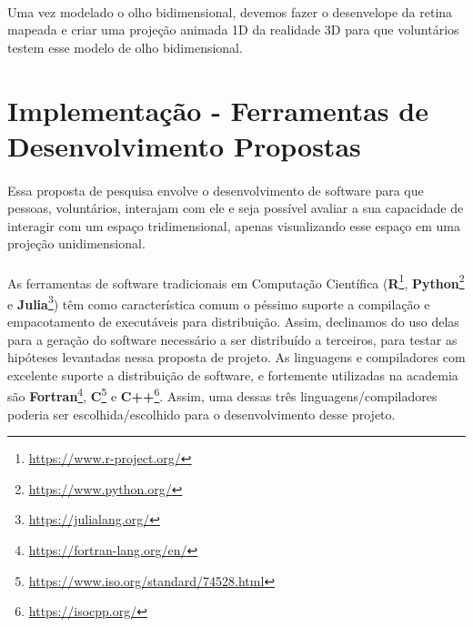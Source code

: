 \documentclass{article}
\begin{document}
	\paragraph{}
	Uma vez modelado o olho bidimensional, devemos fazer o desenvelope da retina mapeada e criar uma projeção animada 1D da realidade 3D para que voluntários testem esse modelo de olho bidimensional. 
		
	\section{Implementação - Ferramentas de Desenvolvimento Propostas} \label{if}
	
	\paragraph{}
	Essa proposta de pesquisa envolve o desenvolvimento de software para que pessoas, voluntários, interajam com ele e seja possível avaliar a sua capacidade de interagir com um espaço tridimensional, apenas visualizando esse espaço em uma projeção unidimensional.
	
	\paragraph{}
	As ferramentas de software tradicionais em Computação Científica (\textbf{R}\footnote{\url{https://www.r-project.org/}}, \textbf{Python}\footnote{\url{https://www.python.org/}} e \textbf{Julia}\footnote{\url{https://julialang.org/}}) têm como característica comum o péssimo suporte a compilação e empacotamento de executáveis para distribuição. Assim, declinamos do uso delas para a geração do software necessário a ser distribuído a terceiros, para testar as hipóteses levantadas nessa proposta de projeto. As linguagens e compiladores com excelente suporte a distribuição de software, e fortemente utilizadas na academia são \textbf{Fortran}\footnote{\url{https://fortran-lang.org/en/}}, \textbf{C}\footnote{\url{https://www.iso.org/standard/74528.html}} e \textbf{C++}\footnote{\url{https://isocpp.org/}}. Assim, uma dessas três linguagens/compiladores poderia ser escolhida/escolhido para o desenvolvimento desse projeto.
	
\end{document}

